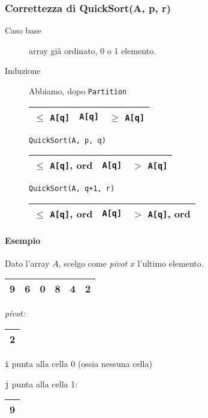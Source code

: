 \subsubsection{Correttezza di QuickSort(A, p, r)}
\begin{description}
	\item[Caso base] array già ordinato, 0 o 1 elemento.
	\item[Induzione] Abbiamo, dopo \texttt{Partition}
	\begin{center}
		\begin{tabular}{| l | l | l |}
			\hline
			$\leq$ \texttt{A[q]} & \texttt{A[q]} & $\geq$ \texttt{A[q]} \\
			\hline 
		\end{tabular}
	\end{center}
	\texttt{QuickSort(A, p, q)} 
	\begin{tabular}{|l|l|l|}
		\hline
		$\leq$ \texttt{A[q]}, ord & \texttt{A[q]} & $>$ \texttt{A[q]} \\
		\hline
	\end{tabular} \par
	\texttt{QuickSort(A, q+1, r)} 
	\begin{tabular}{|l|l|l|}
		\hline
		$\leq$ \texttt{A[q]}, ord & \texttt{A[q]} & $>$ \texttt{A[q]}, ord \\
		\hline
	\end{tabular}
\end{description}

\paragraph{Esempio}

Dato l'array $A$, scelgo come \emph{pivot} $x$ l'ultimo elemento.

\begin{center}
	\begin{tabular}{|l|l|l|l|l|l|}
		\hline
		9 & 6 & 0 & 8 & 4 & 2 \\
		\hline
	\end{tabular}
	\hspace{1cm}
	\emph{pivot: }
	\begin{tabular}{|l|}
		\hline
		2 \\
		\hline
	\end{tabular}
\end{center}

\texttt{i} punta alla cella 0 (ossia nessuna cella) \par
\texttt{j} punta alla cella 1:
\begin{tabular}{|l|}
	\hline
	9 \\
	\hline
\end{tabular}

